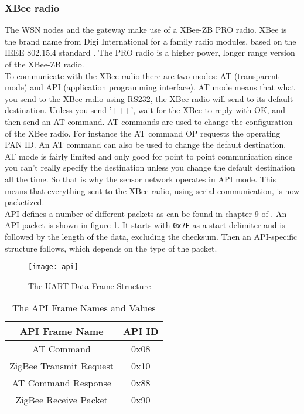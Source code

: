 \subsubsection{XBee radio}
\label{ZBStructure}
The WSN nodes and the gateway make use of a XBee-ZB PRO radio. XBee is the brand name from Digi International for a family radio modules, based on the IEEE 802.15.4 standard . The PRO radio is a higher power, longer range version of the XBee-ZB radio.\\
To communicate with the XBee radio there are two modes: AT (transparent mode) and API (application programming interface). AT mode means that what you send to the XBee radio using RS232, the XBee radio will send to its default destination. Unless you send '+++', wait for the XBee to reply with OK, and then send an AT command. AT commands are used to change the configuration of the XBee radio. For instance the AT command OP requests the operating PAN ID. An AT command can also be used to change the default destination.\\
AT mode is fairly limited and only good for point to point communication since you can't really specify the destination unless you change the default destination all the time. So that is why the sensor network operates in API mode. This means that everything sent to the XBee radio, using serial communication, is now packetized.\\
API defines a number of different packets as can be found in chapter 9 of . An API packet is shown in figure \ref{fig:api}. It starts with \verb+0x7E+ as a start delimiter and is followed by the length of the data, excluding the checksum. Then an API-specific structure follows, which depends on the type of the packet.
\begin{figure}[t]%
\centering
\texttt{[image: api]}
\caption{The UART Data Frame Structure}
\label{fig:api}
\end{figure} 
\begin{table}[t]%
\begin{center}
\begin{tabular}[!ht]{|c|c|}
\hline
\textbf{API Frame Name} & \textbf{API ID}\\
\hline
AT Command & 0x08\\
\hline
ZigBee Transmit Request & 0x10\\
\hline
AT Command Response & 0x88\\
\hline
ZigBee Receive Packet & 0x90\\
\hline
\end{tabular}
\noindent
\caption{The API Frame Names and Values}
\label{tab:apis}
\noindent
\end{center}
\noindent
\end{table}
